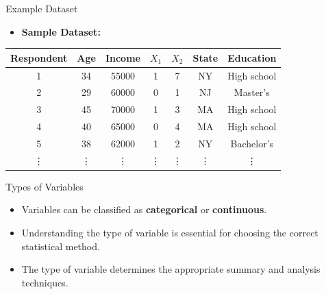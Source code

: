 \documentclass[handout]{beamer} %
\begin{document}
\begin{frame}{Example Dataset}
    \begin{itemize}
        \item \textbf{Sample Dataset:}
    \end{itemize}
        \begin{center}
                     \begin{tabular}{|c|c|c|c|c|c|c|}
            \hline
            \textbf{Respondent} & \textbf{Age} & \textbf{Income} & \textbf{$X_1$} & \textbf{$X_2$} & \textbf{State} & \textbf{Education} \\ \hline
            1 & 34 & 55000 & 1 & 7 & NY & High school \\ \hline
            2 & 29 & 60000 & 0 & 1 & NJ & Master’s \\  \hline
            3 & 45 & 70000 & 1 & 3 & MA & High school \\ \hline
            4 & 40 & 65000 & 0 & 4 & MA & High school \\ \hline
            5 & 38 & 62000 & 1 & 2 & NY & Bachelor’s \\  \hline
            \vdots & \vdots  & \vdots  & \vdots  & \vdots  & \vdots & \vdots   \\ \hline
        \end{tabular}
        \end{center}
\end{frame}

\begin{frame}{Types of Variables}
    \begin{itemize}
        \item Variables can be classified as \textbf{categorical} or \textbf{continuous}.
        \item Understanding the type of variable is essential for choosing the correct statistical method.
        \item The type of variable determines the appropriate summary and analysis techniques.
    \end{itemize}
\end{frame}
\end{document}
